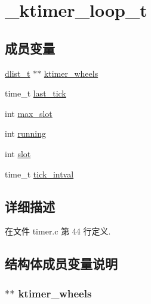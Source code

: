 \hypertarget{struct__ktimer__loop__t}{}\section{\+\_\+ktimer\+\_\+loop\+\_\+t}
\label{struct__ktimer__loop__t}
\subsection*{成员变量}
\begin{DoxyCompactItemize}
\item 
\hyperlink{config_8h_ad6644d67df4b4e3596c1eb12977d1d16}{dlist\+\_\+t} $\ast$$\ast$ \hyperlink{struct__ktimer__loop__t_a69102bd45d4b4970f3e1835cb4f71609}{ktimer\+\_\+wheels}
\item 
time\+\_\+t \hyperlink{struct__ktimer__loop__t_aaaecc5607d83f3b99b0eafd1240c33e8}{last\+\_\+tick}
\item 
int \hyperlink{struct__ktimer__loop__t_a539d113be48c3032a148a47336b35821}{max\+\_\+slot}
\item 
int \hyperlink{struct__ktimer__loop__t_a2f45113638a0b749a8a205d2cd7fb42b}{running}
\item 
int \hyperlink{struct__ktimer__loop__t_a83d6e2127b4cc5e01f2012608487d31a}{slot}
\item 
time\+\_\+t \hyperlink{struct__ktimer__loop__t_a0856d0e2658f936061e29b6429eb0852}{tick\+\_\+intval}
\end{DoxyCompactItemize}


\subsection{详细描述}


在文件 timer.\+c 第 44 行定义.



\subsection{结构体成员变量说明}
\hypertarget{struct__ktimer__loop__t_a69102bd45d4b4970f3e1835cb4f71609}{}
\subsubsection[{ktimer\+\_\+wheels}]{$\ast$$\ast$ ktimer\+\_\+wheels}\label{struct__ktimer__loop__t_a69102bd45d4b4970f3e1835cb4f71609}



